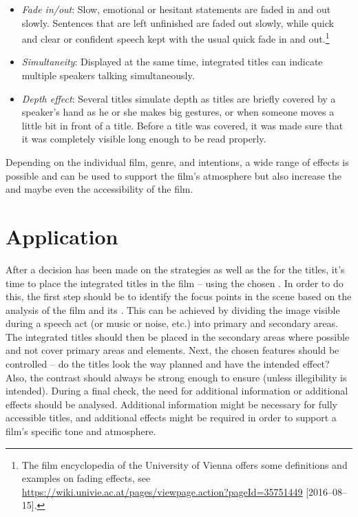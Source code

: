 \begin{itemize}
\item \textit{Fade in/out}: Slow, emotional or hesitant statements are faded in and out slowly. Sentences that are left unfinished are faded out slowly, while quick and clear or confident speech kept with the usual quick fade in and out.\footnote{The film encyclopedia of the University of Vienna offers some definitions and examples on fading effects, see \url{https://wiki.univie.ac.at/pages/viewpage.action?pageId=35751449} [2016--08--15].}
\item \textit{Simultaneity}: Displayed at the same time, integrated titles can indicate multiple speakers talking simultaneously.
\item \textit{Depth effect}: Several titles simulate depth as titles are briefly covered by a speaker’s hand as he or she makes big gestures, or when someone moves a little bit in front of a title. Before a title was covered, it was made sure that it was completely visible long enough to be read properly. 
\end{itemize}

Depending on the individual film, genre, and intentions, a wide range of effects is possible and can be used to support the film’s atmosphere but also increase the  and maybe even the accessibility of the film.

\section{Application}\label{sec:5.3}

After a decision has been made on the strategies as well as the  for the titles, it’s time to place the integrated titles in the film – using the chosen . In order to do this, the first step should be to identify the focus points in the scene based on the analysis of the film and its . This can be achieved by dividing the image visible during a speech act (or music or noise, etc.) into primary and secondary areas. The integrated titles should then be placed in the secondary areas where possible and not cover primary areas and elements. Next, the chosen  features should be controlled – do the titles look the way planned and have the intended effect? Also, the contrast should always be strong enough to ensure  (unless illegibility is intended). During a final check, the need for additional information or additional effects should be analysed. Additional information might be necessary for fully accessible titles, and additional effects might be required in order to support a film’s specific tone and atmosphere.

